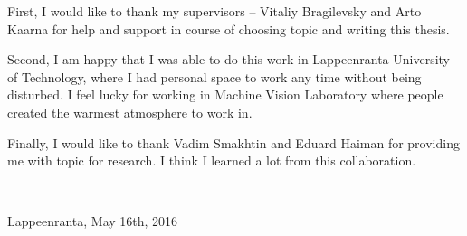 
\begin{preface}
First, I would like to thank my supervisors -- Vitaliy Bragilevsky and Arto Kaarna for
help and support in course of choosing topic and writing this thesis.

Second, I am happy that I was able to do this work in Lappeenranta University of Technology,
where I had personal space to work any time without being disturbed. I feel lucky for
working in Machine Vision Laboratory where people created the warmest atmosphere to work in.

Finally, I would like to thank Vadim Smakhtin and Eduard Haiman for providing me with topic
for research. I think I learned a lot from this collaboration.


\

Lappeenranta, May 16th, 2016
\end{preface}